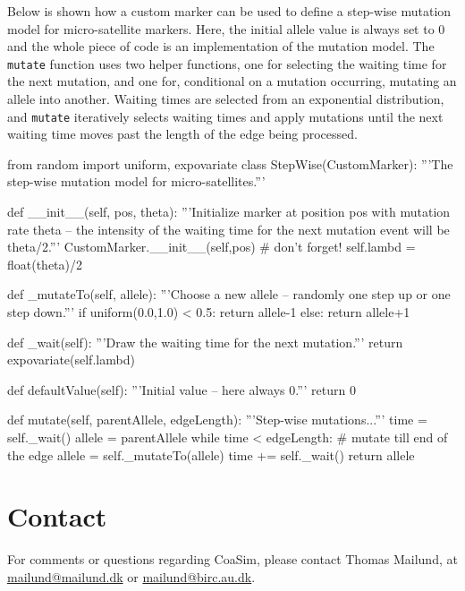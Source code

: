 \documentclass{manual}
\begin{document}
\begin{empfile}
Below is shown how a custom marker can be used to define a step-wise
mutation model for micro-satellite markers.  Here, the initial allele
value is always set to $0$ and the whole piece of code is an
implementation of the mutation model.  The \texttt{mutate} function
uses two helper functions, one for selecting the waiting time for the
next mutation, and one for, conditional on a mutation occurring,
mutating an allele into another.  Waiting times are selected from an
exponential distribution, and \texttt{mutate} iteratively selects
waiting times and apply mutations until the next waiting time moves
past the length of the edge being processed.

\begin{code}
from random import uniform, expovariate
class StepWise(CustomMarker):
    '''The step-wise mutation model for micro-satellites.'''

    def __init__(self, pos, theta):
        '''Initialize marker at position pos with mutation
        rate theta -- the intensity of the waiting time for
        the next mutation event will be theta/2.'''
        CustomMarker.__init__(self,pos) # don't forget!
        self.lambd = float(theta)/2

    def _mutateTo(self, allele):
        '''Choose a new allele -- randomly one step up
        or one step down.'''
        if uniform(0.0,1.0) < 0.5: return allele-1
        else:                      return allele+1

    def _wait(self):
        '''Draw the waiting time for the next mutation.'''
        return expovariate(self.lambd)

    def defaultValue(self):
        '''Initial value -- here always 0.'''
        return 0

    def mutate(self, parentAllele, edgeLength):
        '''Step-wise mutations...'''
        time = self._wait()
        allele = parentAllele
        while time < edgeLength: # mutate till end of the edge
            allele = self._mutateTo(allele)
            time += self._wait()
        return allele
\end{code}

\section{Contact}
\label{sec:contact}

For comments or questions regarding CoaSim, please contact Thomas
Mailund, at \href{mailto:mailund@mailund.dk}{mailund@mailund.dk} or
\href{mailund@birc.au.dk}{mailund@birc.au.dk}.


\end{empfile}
\end{document}
